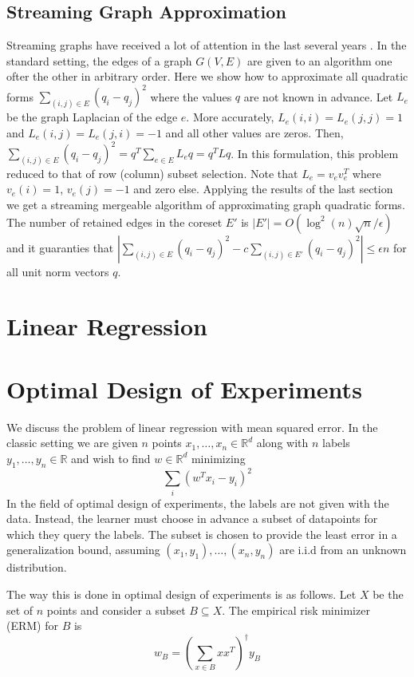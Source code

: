 \documentclass{article} %
\newcommand{\ip}[1]{\left \langle #1 \right \rangle}
\newcommand{\R}{\mathbb{R}}
\newcommand{\eps}{\epsilon}
\begin{document}
\subsection{Streaming Graph Approximation}
Streaming graphs have received a lot of attention in the last several years \cite{}. 
In the standard setting, the edges of a graph $G(V,E)$ are given to an algorithm one ofter the other in arbitrary order.
Here we show how to approximate all quadratic forms $\sum_{(i,j) \in E} (q_i - q_j)^2$ where the values $q$ are not known in advance.
Let $L_e$ be the graph Laplacian of the edge $e$. More accurately, $L_e(i,i) = L_e(j,j) = 1$ and  $L_e(i,j) = L_e(j,i) = -1$ and all other values are zeros.
Then, $\sum_{(i,j) \in E} (q_i - q_j)^2 = q^T \sum_{e \in E}L_e q = q^T L q$. 
In this formulation, this problem reduced to that of row (column) subset selection. 
Note that $L_e = v_ev_e^T$ where $v_e(i) = 1$, $v_e(j)=-1$ and zero else.
Applying the results of the last section we get a streaming mergeable algorithm of approximating graph quadratic forms.
The number of retained edges in the coreset $E'$ is $|E'| = O(\log^{2}(n) \sqrt{n}/\eps)$ and it guaranties that 
$|\sum_{(i,j) \in E} (q_i - q_j)^2  - c \sum_{(i,j) \in E'} (q_i - q_j)^2| \le \eps n$ for all unit norm vectors $q$.



\section{Linear Regression}

\section{Optimal Design of Experiments}
We discuss the problem of linear regression with mean squared error. In the classic setting we are given $n$ points $x_1,\ldots,x_n \in \R^d$ along with $n$ labels $y_1,\ldots,y_n \in \R$ and wish to find $w \in \R^d$ minimizing
$$ \sum_i (w^Tx_i - y_i)^2 $$
In the field of optimal design of experiments, the labels are not given with the data. Instead, the learner must choose in advance a subset of datapoints for which they query the labels. The subset is chosen to provide the least error in a generalization bound, assuming $(x_1,y_1),\ldots,(x_n,y_n)$ are i.i.d from an unknown distribution.

The way this is done in optimal design of experiments is as follows. Let $X$ be the set of $n$ points and consider a subset $B \subseteq X$. The empirical risk minimizer (ERM) for $B$ is 
$$ w_B = \left( \sum_{x \in B} xx^T \right)^{\dagger} y_B $$
\end{document}
